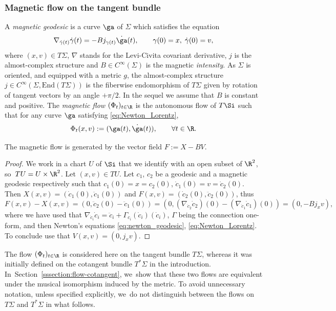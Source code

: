 \subsubsection{Magnetic flow on the tangent bundle}
\label{sssection:magnetic-tsigma}
A {\em magnetic geodesic}
is a curve $\ga $ of $\Sigma$ which satisfies the equation
\begin{equation} \label{eq:Newton_Lorentz}
\nabla_{\dot{\gamma}(t)} \dot{\gamma}(t) = - B j_{\gamma(t)}\dot{\ga} (t),
\qquad \gamma(0)=x,\; \dot{\gamma}(0)=v,
\end{equation}
where $(x,v) \in T\Sigma$, $\nabla$ stands for the Levi-Civita covariant derivative, $j$ is the almost-complex structure and
$ B \in C^\infty(\Sigma)$ is the magnetic {\em intensity}. {\color{black}As $\Sigma$ is oriented, and equipped with a metric $g$, the almost-complex structure $j \in C^\infty(\Sigma,\mathrm{End}(T\Sigma))$ is the fiberwise endomorphism of $T\Sigma$ given by rotation of tangent vectors by an angle $+\pi/2$.} In the sequel we assume that $B$ is constant
and positive.
The {\em magnetic flow} $(\Phi_t)_{t \in \R}$ is the autonomous flow of $T \Si$ such that for
any curve $\ga$ satisfying \eqref{eq:Newton_Lorentz},
\[
\Phi_t (x,v) := (\ga (t), \dot {\ga} (t)), \qquad \forall t \in \R.
\]
\begin{lemma} The magnetic flow is generated by the vector field $F := X - B V$.
\end{lemma}

\begin{proof} We work in a chart $U$ of $\Si$ that we identify with an open
subset of $\R^2$, so~$TU = U \times \R^2$. Let $(x,v) \in TU$. Let $c_1$,
$c_2$ be a geodesic and a magnetic geodesic respectively such that $ c_1
(0) = x = c_2 (0)$, $\dot{c}_1 (0) =v = \dot{c}_2 (0)$. Then $X(x,v) = (
\dot{c}_1 (0), \ddot{c}_1 (0))$ and $F(x,v) = (
\dot{c}_2 (0), \ddot{c}_2 (0)) $, thus
\[
F(x,v) - X(x,v) = (0, \ddot{c}_2 (0) - \ddot{c}_1 (0)) = (0,
(\nabla_{\dot{c}_2} \dot{c}_2) (0) - (\nabla_{\dot{c}_1} \dot{c}_1) (0)
) = (0, -B j_{x} v),
\]
where we have used that $\nabla_{\dot{c}_i} \dot{c}_i = \ddot{c}_i +
\Gamma_{c_i} (\dot{c}_i) (\dot{c}_i)$, $\Gamma$ being the connection
one-form, and then Newton's equations \eqref{eq:newton_geodesic},
\eqref{eq:Newton_Lorentz}. To conclude use that $V (x,v) = (0, j_x v)$.
\end{proof}

\begin{remark}The flow $(\Phi_t)_{t \in \R}$ is considered here on the tangent bundle $T\Sigma$, whereas it was initially defined on the cotangent bundle $T^*\Sigma$ in the introduction. In~Section~\ref{sssection:flow-cotangent}, we~show that these two flows are equivalent under the musical isomorphism induced by the metric. To avoid unnecessary notation, unless specified explicitly, we~do not distinguish between the flows on $T\Sigma$ and $T^*\Sigma$ in what follows.
\end{remark}

